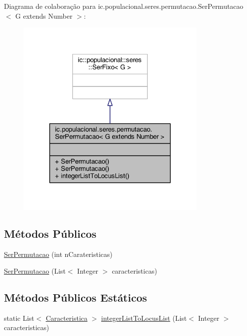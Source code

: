 Diagrama de colaboração para ic.\-populacional.\-seres.\-permutacao.\-Ser\-Permutacao$<$ G extends Number $>$\-:\nopagebreak
\begin{figure}[H]
\begin{center}
\leavevmode
\includegraphics[width=264pt]{classic_1_1populacional_1_1seres_1_1permutacao_1_1_ser_permutacao_3_01_g_01extends_01_number_01_4__coll__graph}
\end{center}
\end{figure}
\subsection*{Métodos Públicos}
\begin{DoxyCompactItemize}
\item 
\hyperlink{classic_1_1populacional_1_1seres_1_1permutacao_1_1_ser_permutacao_3_01_g_01extends_01_number_01_4_a10391d44582e1e7bf901d85d36b7fe35}{Ser\-Permutacao} (int n\-Carateristicas)
\item 
\hyperlink{classic_1_1populacional_1_1seres_1_1permutacao_1_1_ser_permutacao_3_01_g_01extends_01_number_01_4_ad0c8fbe6c0b38c254c2f9b8c3041c96a}{Ser\-Permutacao} (List$<$ Integer $>$ caracteristicas)
\end{DoxyCompactItemize}
\subsection*{Métodos Públicos Estáticos}
\begin{DoxyCompactItemize}
\item 
static List$<$ \hyperlink{interfaceic_1_1populacional_1_1_caracteristica}{Caracteristica} $>$ \hyperlink{classic_1_1populacional_1_1seres_1_1permutacao_1_1_ser_permutacao_3_01_g_01extends_01_number_01_4_a3e652d1e25869d3e88668b0d6439071e}{integer\-List\-To\-Locus\-List} (List$<$ Integer $>$ caracteristicas)
\end{DoxyCompactItemize}


